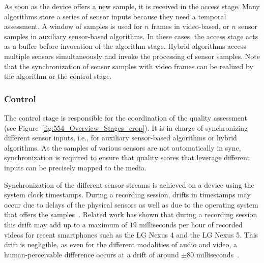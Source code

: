 As soon as the device offers a new sample, it is received in the access stage.
Many algorithms store a series of sensor inputs because they need a temporal assessment. %
A window of samples is used for $n$ frames in video-based, or $n$ sensor samples in auxiliary sensor-based algorithms.
In these cases, the access stage acts as a buffer before invocation of the algorithm stage.
Hybrid algorithms access multiple sensors simultaneously and invoke the processing of sensor samples.
Note that the synchronization of sensor samples with video frames can be realized by the algorithm or the control stage.
\subsubsection{Control}
\label{sec:554_Control}
The control stage is responsible for the coordination of the quality assessment (see Figure~\ref{fig:554_Overview_Stages_crop}).
It is in charge of synchronizing different sensor inputs, i.e., for auxiliary sensor-based algorithms or hybrid algorithms.
As the samples of various sensors are not automatically in sync, synchronization is required to ensure that quality scores that leverage different inputs can be precisely mapped to the media. 

Synchronization of the different sensor streams is achieved on a device using the system clock timestamps. 
During a recording session, drifts in timestamps may occur due to delays of the physical sensors as well as due to the operating system that offers the samples~\cite{Guggenberger2015}. 
Related work has shown that during a recording session this drift may add up to a maximum of $19$ milliseconds per hour of recorded videos for recent smartphones such as the LG Nexus 4 and the LG Nexus 5. 
This drift is negligible, as even for the different modalities of audio and video, a human-perceivable difference occurs at a drift of around $\pm 80$ milliseconds~\cite{Steinmetz1996}. %
